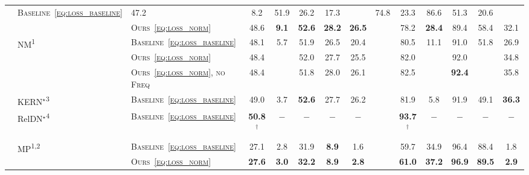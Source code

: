 \begin{table}[t]
\begin{center}
\begin{tabular}{p{0.7cm}|llcccccp{0.1cm}ccccc}
			& \textsc{Baseline~\eqref{eq:loss_baseline}} & 47.2 & 8.2 & 51.9 & 26.2 & \cellcolor{extreme}17.3 & & 74.8 & \cellcolor{bad}23.3 & 86.6 & \cellcolor{bad}51.3 & \cellcolor{extreme}20.6 \Tstrut \\
			& & \textsc{Ours~\eqref{eq:loss_norm}} & 48.6 & \textbf{9.1} & \textbf{52.6} & \textbf{28.2} & \cellcolor{extreme}\textbf{26.5} & & 78.2 & \cellcolor{bad}\textbf{28.4} & 89.4 & \cellcolor{bad}58.4 & \cellcolor{extreme}32.1 \Bstrut \\
			\cline{2-14}
			& \multirow{3}{*}{NM\textsuperscript{1}} & \textsc{Baseline~\eqref{eq:loss_baseline}} & 48.1 & \cellcolor{bad}5.7 & 51.9 & 26.5 & \cellcolor{bad}20.4 & & 80.5 & \cellcolor{extreme}11.1 & 91.0 & \cellcolor{bad}51.8 & \cellcolor{bad}26.9\Tstrut\\
			& & \textsc{Ours~\eqref{eq:loss_norm}} & {48.4} & \cellcolor{bad}{7.1} & {52.0} & {27.7} & \cellcolor{bad}25.5 & & 82.0 & \cellcolor{extreme}{16.7} & {92.0} & \cellcolor{bad}{56.4} & \cellcolor{bad}34.8 \\
			& & \textsc{Ours~\eqref{eq:loss_norm}, no Freq} & {48.4} & \cellcolor{bad}{8.9} & 51.8 & {28.0} & \cellcolor{bad}26.1 & & {82.5} & \cellcolor{extreme}{26.6} & \textbf{{92.4}} & \cellcolor{bad}{\textbf{60.3}} & \cellcolor{bad}35.8\Bstrut \\
			\cline{2-14}
			& KERN$^\star$\textsuperscript{3} & \textsc{Baseline~\eqref{eq:loss_baseline}} & 49.0 & 3.7 & \textbf{52.6} & 27.7 & 26.2 & & 81.9 & 5.8 & 91.9 & 49.1 & \textbf{36.3}\Tstrut\\
			& RelDN$^\star$\textsuperscript{4} & \textsc{Baseline~\eqref{eq:loss_baseline}} & \textbf{50.8$^\dagger$} & $-$ & $-$ & $-$ & $-$ & & \textbf{93.7$^\dagger$} & $-$ & $-$ & $-$ & $-$\Bstrut\\
			\hline\hline\\
			\multirow{2}{*}{\rotatebox[origin=c]{90}{\parbox{0.48cm}{\tiny\vspace{2pt}\textbf{GQA}}}} & \multirow{2}{*}{MP\textsuperscript{1,2}} & \textsc{Baseline~\eqref{eq:loss_baseline}} & 27.1 & 2.8 & 31.9 & \textbf{{8.9}} & \cellcolor{extreme}1.6 & & 59.7 & 34.9 & 96.4 & 88.4 & \cellcolor{extreme}1.8\\
			\multirow{3}{*}{\rotatebox[origin=c]{90}{\parbox{1.6cm}{\tiny\vspace{0pt}\centering\hspace{-5pt}\textbf{GQA\\-nLR}}}} & & \textsc{Ours~\eqref{eq:loss_norm}} & \textbf{27.6} & \textbf{{3.0}} & \textbf{{32.2}} & \textbf{{8.9}} & \cellcolor{extreme}\textbf{2.8} & & \textbf{{61.0}} & {\textbf{37.2}} & {\textbf{96.9}} & \textbf{89.5} & \cellcolor{extreme}\textbf{2.9} \Bstrut \\

\end{tabular}
\end{center}
\end{table}
